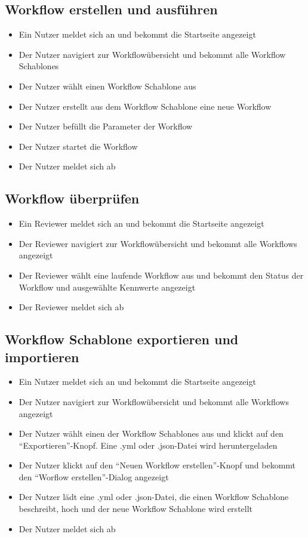 \subsection*{\gls{Workflow} erstellen und ausführen}
\begin{itemize}
    \item Ein \Gls{Nutzer} meldet sich an und bekommt die Startseite angezeigt
    \item Der \Gls{Nutzer} navigiert zur Workflowübersicht und bekommt alle \glspl{Workflow Schablone}
    \item Der \gls{Nutzer} wählt einen \gls{Workflow Schablone} aus
    \item Der \gls{Nutzer} erstellt aus dem \gls{Workflow Schablone} eine neue \gls{Workflow} 
    \item Der \gls{Nutzer} befüllt die Parameter der \gls{Workflow}
    \item Der \gls{Nutzer} startet die \gls{Workflow}
    \item Der \gls{Nutzer} meldet sich ab
\end{itemize}

%
\subsection*{\gls{Workflow} überprüfen}
\begin{itemize}
    \item Ein \Gls{Reviewer} meldet sich an und bekommt die Startseite angezeigt
    \item Der \Gls{Reviewer} navigiert zur Workflowübersicht und bekommt alle \glspl{Workflow} angezeigt
    \item Der \Gls{Reviewer} wählt eine laufende \gls{Workflow} aus und bekommt den Status der \gls{Workflow} und ausgewählte Kennwerte angezeigt
    \item Der \gls{Reviewer} meldet sich ab
\end{itemize}

\subsection*{\gls{Workflow Schablone} exportieren und importieren}
\begin{itemize}
    \item Ein \gls{Nutzer} meldet sich an und bekommt die Startseite angezeigt
    \item Der \gls{Nutzer} navigiert zur Workflowübersicht und bekommt alle Workflows angezeigt
    \item Der \gls{Nutzer} wählt einen der \glspl{Workflow Schablone} aus und klickt auf den \enquote{Exportieren}-Knopf. Eine .yml oder .json-Datei wird heruntergeladen
    \item Der \gls{Nutzer} klickt auf den \enquote{Neuen Workflow erstellen}-Knopf und bekommt den \enquote{Worflow erstellen}-Dialog angezeigt
    \item Der \gls{Nutzer} lädt eine .yml oder .json-Datei, die einen \gls{Workflow Schablone} beschreibt, hoch und der neue \gls{Workflow Schablone} wird erstellt
    \item Der \gls{Nutzer} meldet sich ab
\end{itemize}

